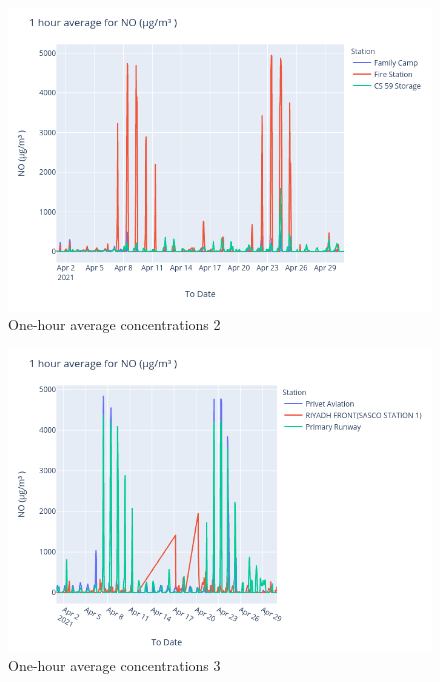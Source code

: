 \documentclass[12pt, oneside]{book}
\begin{document}
{
{\begin{figure}[H]
\centering
\includegraphics[width=\textwidth]{image202}
\caption{One-hour average  concentrations 2}\label{image202}
\end{figure}}{}


{\begin{figure}[H]
\centering
\includegraphics[width=\textwidth]{image214}
\caption{One-hour average  concentrations 3}\label{image214}
\end{figure}}{}


}
\end{document}
